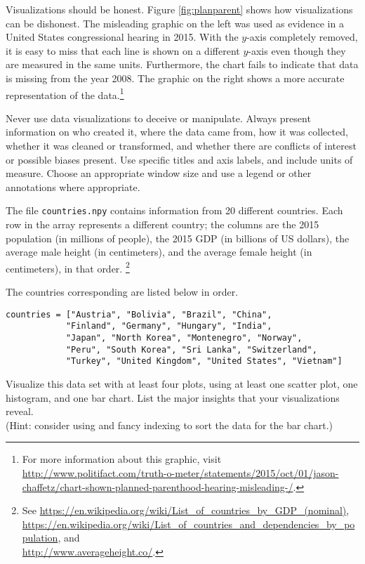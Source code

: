 Visualizations should be honest.
Figure \ref{fig:planparent} shows how visualizations can be dishonest.
The misleading graphic on the left was used as evidence in a United States congressional hearing in 2015.
With the $y$-axis completely removed, it is easy to miss that each line is shown on a different $y$-axis even though they are measured in the same units.
Furthermore, the chart fails to indicate that data is missing from the year 2008.
The graphic on the right shows a more accurate representation of the data.\footnote{For more information about this graphic, visit \url{http://www.politifact.com/truth-o-meter/statements/2015/oct/01/jason-chaffetz/chart-shown-planned-parenthood-hearing-misleading-/}.}

Never use data visualizations to deceive or manipulate.
Always present information on who created it, where the data came from, how it was collected, whether it was cleaned or transformed, and whether there are conflicts of interest or possible biases present.
Use specific titles and axis labels, and include units of measure.
Choose an appropriate window size and use a legend or other annotations where appropriate.

\begin{problem}
The file \texttt{countries.npy} contains information from 20 different countries.
Each row in the array represents a different country; the columns are the 2015 population (in millions of people), the 2015 GDP (in billions of US dollars), the average male height (in centimeters), and the average female height (in centimeters), in that order.%
\footnote{
See \url{https://en.wikipedia.org/wiki/List_of_countries_by_GDP_(nominal)},
\\ \url{https://en.wikipedia.org/wiki/List_of_countries_and_dependencies_by_population}, and
\\ \url{http://www.averageheight.co/}.
}

The countries corresponding are listed below in order.

\begin{lstlisting}
countries = ["Austria", "Bolivia", "Brazil", "China",
            "Finland", "Germany", "Hungary", "India",
            "Japan", "North Korea", "Montenegro", "Norway",
            "Peru", "South Korea", "Sri Lanka", "Switzerland",
            "Turkey", "United Kingdom", "United States", "Vietnam"]
\end{lstlisting}

Visualize this data set with at least four plots, using at least one scatter plot, one histogram, and one bar chart.
List the major insights that your visualizations reveal.
\\(Hint: consider using  and fancy indexing to sort the data for the bar chart.)
\end{problem}

